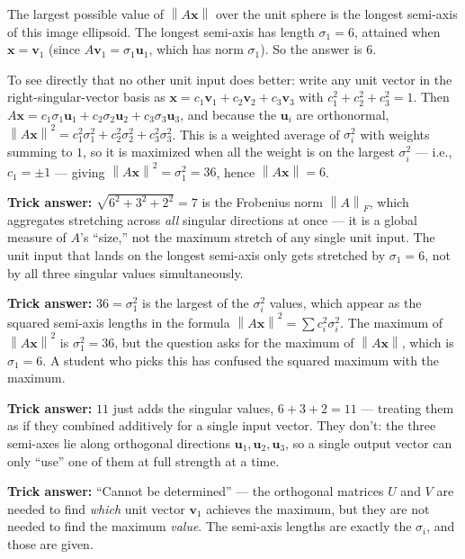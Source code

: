\documentclass[12pt]{amsart}
\newcommand{\norm}[1]{\left\|#1\right\|}
\begin{document}
The largest possible value of $\norm{A\mathbf{x}}$ over the unit sphere is
the longest semi-axis of this image ellipsoid. The longest semi-axis has
length $\sigma_1 = 6$, attained when $\mathbf{x} = \mathbf{v}_1$ (since
$A\mathbf{v}_1 = \sigma_1 \mathbf{u}_1$, which has norm $\sigma_1$). So
the answer is $6$.

To see directly that no other unit input does better: write any unit vector
in the right-singular-vector basis as $\mathbf{x} = c_1 \mathbf{v}_1 + c_2 \mathbf{v}_2 + c_3 \mathbf{v}_3$
with $c_1^2 + c_2^2 + c_3^2 = 1$. Then
$A\mathbf{x} = c_1 \sigma_1 \mathbf{u}_1 + c_2 \sigma_2 \mathbf{u}_2 + c_3 \sigma_3 \mathbf{u}_3$,
and because the $\mathbf{u}_i$ are orthonormal,
$\norm{A\mathbf{x}}^2 = c_1^2 \sigma_1^2 + c_2^2 \sigma_2^2 + c_3^2 \sigma_3^2$.
This is a weighted average of $\sigma_i^2$ with weights summing to $1$, so
it is maximized when all the weight is on the largest $\sigma_i^2$ ---
i.e., $c_1 = \pm 1$ --- giving $\norm{A\mathbf{x}}^2 = \sigma_1^2 = 36$,
hence $\norm{A\mathbf{x}} = 6$.

\textbf{Trick answer:}
$\sqrt{6^2 + 3^2 + 2^2} = 7$ is the Frobenius norm $\norm{A}_F$, which
aggregates stretching across \emph{all} singular directions at once ---
it is a global measure of $A$'s ``size,'' not the maximum stretch of any
single unit input. The unit input that lands on the longest semi-axis only
gets stretched by $\sigma_1 = 6$, not by all three singular values
simultaneously.

\textbf{Trick answer:}
$36 = \sigma_1^2$ is the largest of the $\sigma_i^2$ values, which appear
as the squared semi-axis lengths in the formula
$\norm{A\mathbf{x}}^2 = \sum c_i^2 \sigma_i^2$. The maximum of
$\norm{A\mathbf{x}}^2$ is $\sigma_1^2 = 36$, but the question asks for
the maximum of $\norm{A\mathbf{x}}$, which is $\sigma_1 = 6$. A student
who picks this has confused the squared maximum with the maximum.

\textbf{Trick answer:}
$11$ just adds the singular values, $6 + 3 + 2 = 11$ --- treating them as
if they combined additively for a single input vector. They don't: the
three semi-axes lie along orthogonal directions $\mathbf{u}_1, \mathbf{u}_2, \mathbf{u}_3$,
so a single output vector can only ``use'' one of them at full strength
at a time.

\textbf{Trick answer:}
``Cannot be determined'' --- the orthogonal matrices $U$ and $V$ are needed
to find \emph{which} unit vector $\mathbf{v}_1$ achieves the maximum, but
they are not needed to find the maximum \emph{value}. The semi-axis lengths
are exactly the $\sigma_i$, and those are given.
\end{document}
